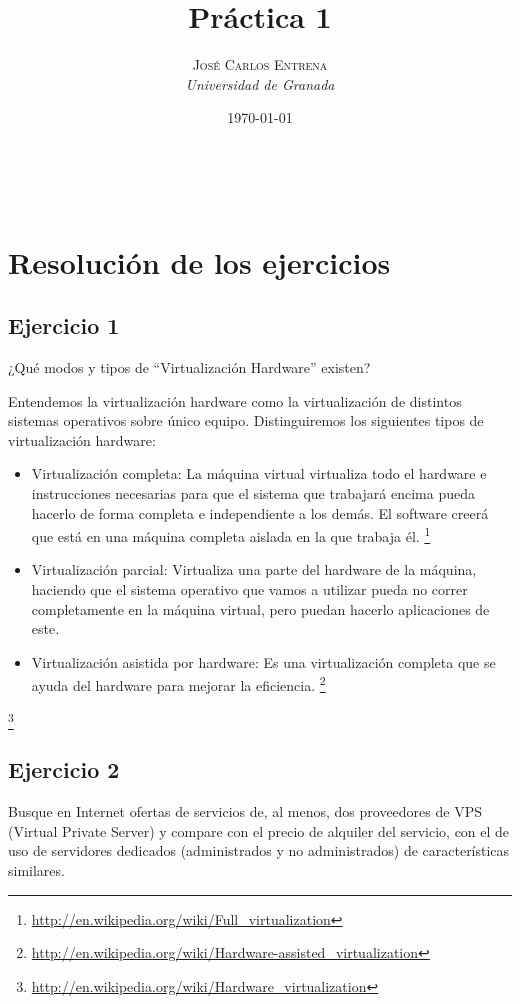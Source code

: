 \documentclass[a4paper, 11pt]{article} %
\title{\textbf{Práctica 1}\\ %
} %
\author{\textsc{José Carlos Entrena} %
\\{\textit{Universidad de Granada}}} %
\date{\today} %
\makeatletter
\renewcommand{\maketitle}{ %
\begin{flushright} %
{\LARGE\@title} %

\vspace{60pt} %

{\large\@author} %
\\\@date %

\vspace{40pt} %
\end{flushright}
}
\makeatother
\begin{document}
\maketitle %

{\parskip=2pt
  \tableofcontents
}   %

\pagebreak %

\section{Resolución de los ejercicios}

\subsection*{Ejercicio 1}
¿Qué modos y tipos de “Virtualización Hardware” existen?

Entendemos la virtualización hardware como la virtualización de distintos sistemas operativos sobre único equipo. 
Distinguiremos los siguientes tipos de virtualización hardware: 
\begin{itemize}
\item Virtualización completa: La máquina virtual virtualiza todo el hardware e instrucciones necesarias para que el sistema que trabajará encima pueda hacerlo de forma completa e independiente a los demás. El software creerá que está en una máquina completa aislada en la que trabaja él. \footnote{\url{http://en.wikipedia.org/wiki/Full_virtualization}}
\item Virtualización parcial: Virtualiza una parte del hardware de la máquina, haciendo que el sistema operativo que vamos a utilizar pueda no correr completamente en la máquina virtual, pero puedan hacerlo aplicaciones de este. 
\item Virtualización asistida por hardware: Es una virtualización completa que se ayuda del hardware para mejorar la eficiencia. \footnote{\url{http://en.wikipedia.org/wiki/Hardware-assisted_virtualization}}
\end{itemize}
\footnote{\url{http://en.wikipedia.org/wiki/Hardware_virtualization}}

\subsection*{Ejercicio 2}
Busque en Internet ofertas de servicios de, al menos, dos proveedores de VPS (Virtual Private Server) y compare con el precio de alquiler del servicio, con el de uso de servidores dedicados (administrados y no administrados) de características similares.
\end{document}
